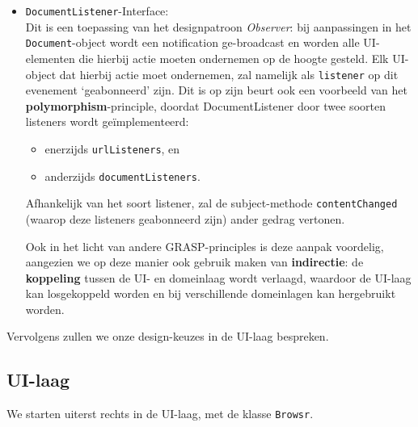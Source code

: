 \documentclass[12pt]{article}
\begin{document}
\begin{itemize}
	\item \texttt{DocumentListener}-Interface:\\
	Dit is een toepassing van het designpatroon \textit{Observer}: bij aanpassingen in het \texttt{Document}-object wordt een notification ge-broadcast en worden alle UI-elementen die hierbij actie moeten ondernemen op de hoogte gesteld. Elk UI-object dat hierbij actie moet ondernemen, zal namelijk als \texttt{listener} op dit evenement `geabonneerd' zijn. Dit is op zijn beurt ook een voorbeeld van het \textbf{polymorphism}-principle, doordat DocumentListener door twee soorten listeners wordt geïmplementeerd: 
	\begin{itemize}
		\item enerzijds \texttt{urlListeners}, en 
		\item anderzijds \texttt{documentListeners}.
	\end{itemize} 
	Afhankelijk van het soort listener, zal de subject-methode \texttt{contentChanged} (waarop deze listeners geabonneerd zijn) ander gedrag vertonen.
	
	
	Ook in het licht van andere GRASP-principles is deze aanpak voordelig, aangezien we op deze manier ook gebruik maken van \textbf{indirectie}: de \textbf{koppeling} tussen de UI- en domeinlaag wordt verlaagd, waardoor de UI-laag kan losgekoppeld worden en bij verschillende domeinlagen kan hergebruikt worden.
\end{itemize}

Vervolgens zullen we onze design-keuzes in de UI-laag bespreken.

\subsection{UI-laag}

We starten uiterst rechts in de UI-laag, met de klasse \texttt{Browsr}.
\end{document}
